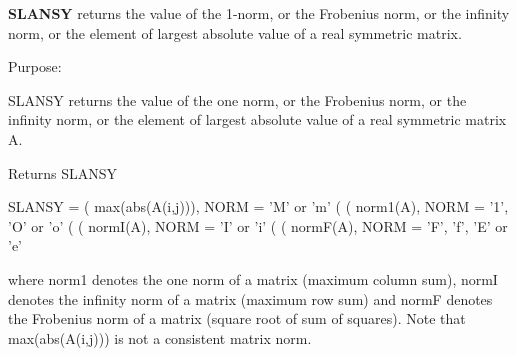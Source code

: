 {\bfseries S\+L\+A\+N\+S\+Y} returns the value of the 1-\/norm, or the Frobenius norm, or the infinity norm, or the element of largest absolute value of a real symmetric matrix. 

 \begin{DoxyParagraph}{Purpose\+: }
\begin{DoxyVerb} SLANSY  returns the value of the one norm,  or the Frobenius norm, or
 the  infinity norm,  or the  element of  largest absolute value  of a
 real symmetric matrix A.\end{DoxyVerb}

\end{DoxyParagraph}
\begin{DoxyReturn}{Returns}
S\+L\+A\+N\+S\+Y \begin{DoxyVerb}    SLANSY = ( max(abs(A(i,j))), NORM = 'M' or 'm'
             (
             ( norm1(A),         NORM = '1', 'O' or 'o'
             (
             ( normI(A),         NORM = 'I' or 'i'
             (
             ( normF(A),         NORM = 'F', 'f', 'E' or 'e'

 where  norm1  denotes the  one norm of a matrix (maximum column sum),
 normI  denotes the  infinity norm  of a matrix  (maximum row sum) and
 normF  denotes the  Frobenius norm of a matrix (square root of sum of
 squares).  Note that  max(abs(A(i,j)))  is not a consistent matrix norm.\end{DoxyVerb}
 
\end{DoxyReturn}

